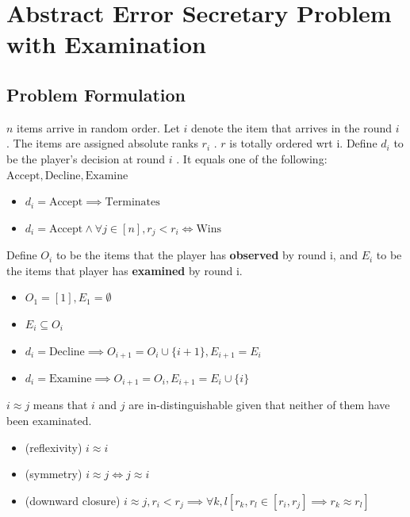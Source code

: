 \section{Abstract Error Secretary Problem with Examination}
\subsection{Problem Formulation}
$n$ items arrive in random order. Let $i$ denote the item that arrives in the round $i$ .  
The items are assigned absolute ranks $r_i$ . $r$ is totally ordered wrt i.  
Define $d_i$ to be the player's decision at round $i$ . It equals one of the following: $\text{Accept}, \text{Decline}, \text{Examine}$  
\begin{itemize}
	\item $d_i = \text{Accept} \implies \text{Terminates}$  
	\item $d_i = \text{Accept} \land \forall j\in [n], r_j < r_i \iff \text{Wins}$  
\end{itemize}
Define $O_i$ to be the items that the player has \textbf{observed} by round i, and $E_i$ to be the items that player has \textbf{examined} by round i.  
\begin{itemize}
	\item $O_1 = [1], E_1 = \emptyset$  
	\item $E_i \subseteq O_i$  
	\item $d_i = \text{Decline} \implies O_{i+1} = O_i \cup \{i+1\}, E_{i+1} = E_i$  
	\item $d_i = \text{Examine} \implies O_{i+1} = O_i , E_{i+1} = E_{i} \cup \{i\}$  
\end{itemize}

\begin{definition}
$i \approx j$ means that $i$ and $j$ are in-distinguishable given that neither of them have been examinated.
	\begin{itemize}
 \item (reflexivity) $i \approx i$
  \item(symmetry) $i \approx j \iff j \approx i$
  \item(downward closure) $i \approx j , r_i < r_j \implies \forall k, l [r_k, r_l \in [r_i, r_j] \implies r_k \approx r_l ]$
\end{itemize}
\end{definition}   


